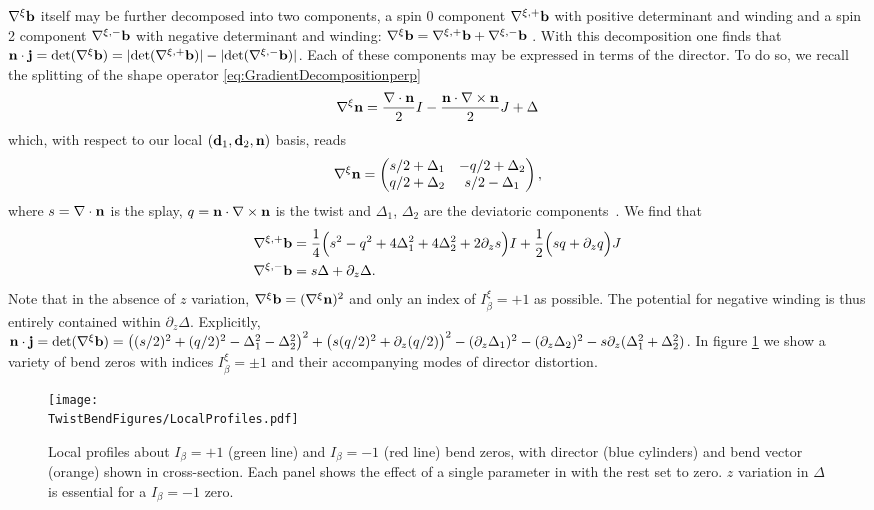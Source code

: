 $\nabla^\xi \mathbf{b}$ itself may be further decomposed into two components, a spin 0 component $\nabla^{\xi, +} \mathbf{b}$ with positive determinant and winding and a spin 2 component $\nabla^{\xi, -} \mathbf{b}$ with negative determinant and winding: $\nabla^\xi \mathbf{b} = \nabla^{\xi,+} \mathbf{b} + \nabla^{\xi,-} \mathbf{b}$ \cite{MachonThesis}. With this decomposition one finds that $\mathbf{n} \cdot \mathbf{j} = \mathrm{det}(\nabla^\xi \mathbf{b}) = |\mathrm{det}(\nabla^{\xi, +} \mathbf{b})| - |\mathrm{det}(\nabla^{\xi, -} \mathbf{b})|$. Each of these components may be expressed in terms of the director. To do so, we recall the splitting of the shape operator \eqref{eq:GradientDecompositionperp}
\begin{align}
    \nabla^\xi {\bf n}= \frac{\nabla \cdot {\bf n}}{2}I - \frac{{\bf n} \cdot \nabla \times {\bf n}}{2} J + \Delta
\end{align} 
which, with respect to our local $(\mathbf{d}_1,\mathbf{d}_2,\mathbf{n})$ basis, reads 
\begin{align}
 \nabla^\xi {\bf n}=\begin{pmatrix} s/2 + \Delta_1 & -q/2 + \Delta_2 \\ q/2 + \Delta_2 & s/2 - \Delta_1 \end{pmatrix} ,
\end{align} 
where $s = \nabla \cdot \mathbf{n}$ is the splay, $q = \mathbf{n} \cdot \nabla \times \mathbf{n}$ is the twist and $\Delta_1$, $\Delta_2$ are the deviatoric components~\cite{MachonThesis,Selinger2019}. We find that
\begin{align}
\nabla^{\xi,+} \mathbf{b} &=
\frac{1}{4}\Big(s^2 - q^2 + 4\Delta_1^2 + 4\Delta_2^2 +2\partial_z s\Big)I+
\frac{1}{2} \Big(sq + \partial_z q \Big)J  \\
\nabla^{\xi,-} \mathbf{b} &= s \Delta +\partial_z \Delta.
\end{align}
 Note that in the absence of $z$ variation, $\nabla^\xi \mathbf{b} = (\nabla^\xi{\bf n})^2$ and only an index of $I^\xi_\beta = +1$ as possible. The potential for negative winding is thus entirely contained within $\partial_z \Delta$. Explicitly, $\mathbf{n} \cdot \mathbf{j} = \mathrm{det}(\nabla^\xi \mathbf{b}) = \left( (s/2)^2 +(q/2)^2 -\Delta_1^2 - \Delta_2^2\right)^2 +\left(s(q/2)^2 + \partial_z (q/2)\right)^2 - (\partial_z \Delta_1) ^2 - (\partial_z \Delta_2)^2 - s \partial_z(\Delta_1^2 + \Delta_2^2)$.  In figure \ref{fig:LocalProfiles} we show a variety of bend zeros with indices $I^\xi_\beta = \pm 1$ and their accompanying modes of director distortion.

\begin{figure}[htbp]
    \centering
    \texttt{[image: \\TwistBendFigures/LocalProfiles.pdf]}
    \caption{Local profiles about $I_\beta = +1$ (green line) and $I_\beta = -1$ (red line) bend zeros, with director (blue cylinders) and bend vector (orange) shown in cross-section. Each panel shows the effect of a single parameter in  with the rest set to zero. $z$ variation in $\Delta$ is essential for a $I_\beta = -1$ zero.}
    \label{fig:LocalProfiles}
\end{figure}


